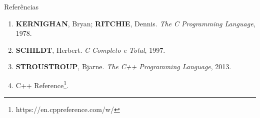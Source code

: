 \begin{frame}[fragile]{Referências}

    \begin{enumerate}
        \item \textbf{KERNIGHAN}, Bryan; \textbf{RITCHIE}, Dennis. \textit{The C Programming Language}, 1978.

        \item \textbf{SCHILDT}, Herbert. \textit{C Completo e Total}, 1997.

        \item \textbf{STROUSTROUP}, Bjarne. \textit{The C++ Programming Language}, 2013.

		\item C++ Reference\footnote{https://en.cppreference.com/w/}.

    \end{enumerate}

\end{frame}
